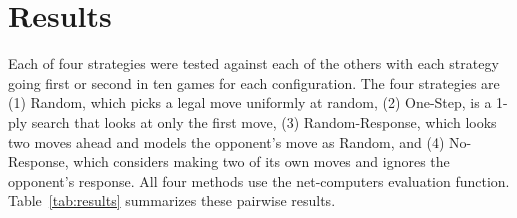\documentclass{sig-alternate-05-2015}
\begin{document}
% 

\section{Results}
\label{sec:results}




Each of four strategies were tested against each of the others with each strategy going first or second in ten games for each configuration.
The four strategies are (1) Random, which picks a legal move uniformly at random, (2) One-Step, is a 1-ply search that looks at only the first move, 
(3) Random-Response, which looks two moves ahead and models the opponent's move as Random, and 
(4) No-Response, which considers making two of its own moves and ignores the opponent's response.
All four methods use the net-computers evaluation function.
Table~\ref{tab:results} summarizes these pairwise results.
\end{document}

